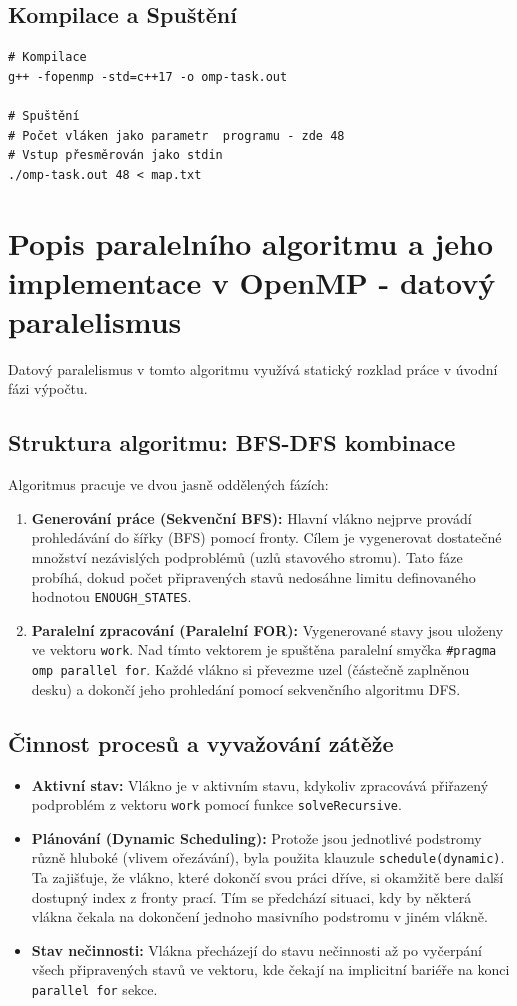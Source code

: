 \documentclass[11pt,a4paper]{article}
\begin{document}
\subsection{Kompilace a Spuštění}

\begin{verbatim}
# Kompilace
g++ -fopenmp -std=c++17 -o omp-task.out

# Spuštění
# Počet vláken jako parametr  programu - zde 48
# Vstup přesměrován jako stdin
./omp-task.out 48 < map.txt
\end{verbatim}

\section{Popis paralelního algoritmu a jeho implementace v OpenMP - datový paralelismus}
Datový paralelismus v tomto algoritmu využívá statický rozklad práce v úvodní fázi výpočtu.

\subsection{Struktura algoritmu: BFS-DFS kombinace}
Algoritmus pracuje ve dvou jasně oddělených fázích:
\begin{enumerate}
    \item \textbf{Generování práce (Sekvenční BFS):} Hlavní vlákno nejprve provádí prohledávání do šířky (BFS) pomocí fronty. Cílem je vygenerovat dostatečné množství nezávislých podproblémů (uzlů stavového stromu). Tato fáze probíhá, dokud počet připravených stavů nedosáhne limitu definovaného hodnotou \texttt{ENOUGH\_STATES}.
    \item \textbf{Paralelní zpracování (Paralelní FOR):} Vygenerované stavy jsou uloženy ve vektoru \texttt{work}. Nad tímto vektorem je spuštěna paralelní smyčka \texttt{\#pragma omp parallel for}. Každé vlákno si převezme uzel (částečně zaplněnou desku) a dokončí jeho prohledání pomocí sekvenčního algoritmu DFS.
\end{enumerate}

\subsection{Činnost procesů a vyvažování zátěže}
\begin{itemize}
    \item \textbf{Aktivní stav:} Vlákno je v aktivním stavu, kdykoliv zpracovává přiřazený podproblém z vektoru \texttt{work} pomocí funkce \texttt{solveRecursive}.
    \item \textbf{Plánování (Dynamic Scheduling):} Protože jsou jednotlivé podstromy různě hluboké (vlivem ořezávání), byla použita klauzule \texttt{schedule(dynamic)}. Ta zajišťuje, že vlákno, které dokončí svou práci dříve, si okamžitě bere další dostupný index z fronty prací. Tím se předchází situaci, kdy by některá vlákna čekala na dokončení jednoho masivního podstromu v jiném vlákně.
    \item \textbf{Stav nečinnosti:} Vlákna přecházejí do stavu nečinnosti až po vyčerpání všech připravených stavů ve vektoru, kde čekají na implicitní bariéře na konci \texttt{parallel for} sekce.
\end{itemize}
\end{document}
